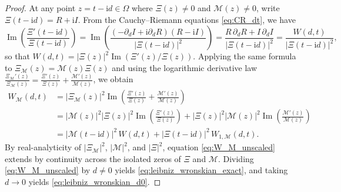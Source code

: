 \documentclass[11pt,reqno,a4paper]{amsart}
\theoremstyle{plain}
\theoremstyle{definition}
\theoremstyle{remark}
\numberwithin{equation}{section}
\newcommand{\ii}{\mathrm{i}}
\begin{document}
\begin{proof}
At any point $z = t - \ii d \in \Omega$ where $\Xi(z) \neq 0$ and $\mathcal{M}(z) \neq 0$, write $\Xi(t-\ii d) = R + \ii I$. From the Cauchy--Riemann equations \eqref{eq:CR_dt}, we have
\begin{equation}\label{eq:im_log_deriv}
  \operatorname{Im}\left(\frac{\Xi'(t - \ii d)}{\Xi(t - \ii d)}\right)
  = \operatorname{Im}\left(\frac{(-\partial_d I + \ii\partial_d R)(R - \ii I)}{|\Xi(t - \ii d)|^2}\right)
  = \frac{R\,\partial_d R + I\,\partial_d I}{|\Xi(t - \ii d)|^2}
  = \frac{W(d,t)}{|\Xi(t - \ii d)|^2},
\end{equation}
so that $W(d,t) = |\Xi(z)|^2\operatorname{Im}(\Xi'(z)/\Xi(z))$. Applying the same formula to $\Xi_{\mathcal{M}}(z) = \mathcal{M}(z)\Xi(z)$ and using the logarithmic derivative law $\frac{\Xi_{\mathcal{M}}'(z)}{\Xi_{\mathcal{M}}(z)} = \frac{\Xi'(z)}{\Xi(z)} + \frac{\mathcal{M}'(z)}{\mathcal{M}(z)}$, we obtain
\begin{align}
  W_{\mathcal{M}}(d,t)
  &= \big|\Xi_{\mathcal{M}}(z)\big|^2\operatorname{Im}\left(\frac{\Xi'(z)}{\Xi(z)} + \frac{\mathcal{M}'(z)}{\mathcal{M}(z)}\right) \nonumber \\
  &= \big|\mathcal{M}(z)\big|^2\big|\Xi(z)\big|^2\operatorname{Im}\left(\frac{\Xi'(z)}{\Xi(z)}\right)
   + \big|\Xi(z)\big|^2\big|\mathcal{M}(z)\big|^2\operatorname{Im}\left(\frac{\mathcal{M}'(z)}{\mathcal{M}(z)}\right) \nonumber \\
  &= \big|\mathcal{M}(t - \ii d)\big|^2\,W(d,t) + \big|\Xi(t - \ii d)\big|^2\,W_{1,\mathcal{M}}(d,t). \label{eq:W_M_unscaled}
\end{align}
By real-analyticity of $|\Xi_{\mathcal{M}}|^2$, $|\mathcal{M}|^2$, and $|\Xi|^2$, equation \eqref{eq:W_M_unscaled} extends by continuity across the isolated zeros of $\Xi$ and $\mathcal{M}$. Dividing \eqref{eq:W_M_unscaled} by $d \neq 0$ yields \eqref{eq:leibniz_wronskian_exact}, and taking $d \to 0$ yields \eqref{eq:leibniz_wronskian_d0}.
\end{proof}
\end{document}
